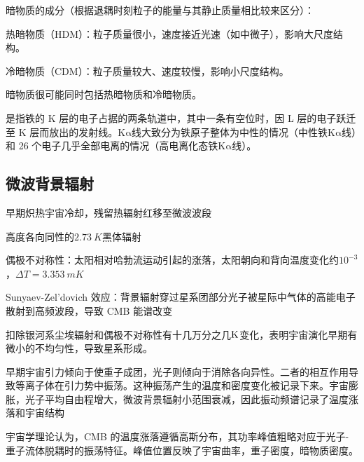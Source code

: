 \documentclass[../天体物理基础.tex]{subfiles}
\begin{document}
暗物质的成分（根据退耦时刻粒子的能量与其静止质量相比较来区分）：

热暗物质（HDM）：粒子质量很小，速度接近光速（如中微子），影响大尺度结构。

冷暗物质（CDM）：粒子质量较大、速度较慢，影响小尺度结构。

暗物质很可能同时包括热暗物质和冷暗物质。

是指铁的 K 层的电子占据的两条轨道中，其中一条有空位时，因 L 层的电子跃迁至 K 层而放出的发射线。$\mathrm{K\alpha}$线大致分为铁原子整体为中性的情况（中性铁$\mathrm{K\alpha}$线）和 26 个电子几乎全部电离的情况（高电离化态铁$\mathrm{K\alpha}$线）。


\subsection{微波背景辐射}
早期炽热宇宙冷却，残留热辐射红移至微波波段

高度各向同性的$\qty{2.73}{K}$黑体辐射

偶极不对称性：太阳相对哈勃流运动引起的涨落，太阳朝向和背向温度变化约$10^{-3}$，$\Delta T=\qty{3.353}{mK}$

Sunyaev-Zel'dovich 效应：背景辐射穿过星系团部分光子被星际中气体的高能电子散射到高频波段，导致 CMB 能谱改变

扣除银河系尘埃辐射和偶极不对称性有十几万分之几$\rm K$变化，表明宇宙演化早期有微小的不均匀性，导致星系形成。

早期宇宙引力倾向于使重子成团，光子则倾向于消除各向异性。二者的相互作用导致等离子体在引力势中振荡。这种振荡产生的温度和密度变化被记录下来。宇宙膨胀，光子平均自由程增大，微波背景辐射小范围衰减，因此振动频谱记录了温度涨落和宇宙结构

宇宙学理论认为，CMB 的温度涨落遵循高斯分布，其功率峰值粗略对应于光子{}-{}重子流体脱耦时的振荡特征。峰值位置反映了宇宙曲率，重子密度，暗物质密度。

\printbibliography
\end{document}
